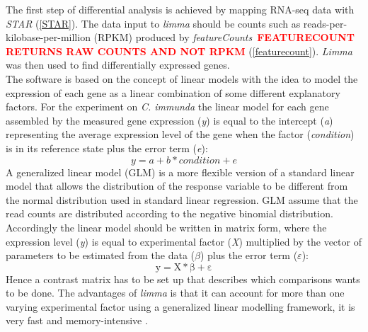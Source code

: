 \documentclass[12pt, a4paper]{report}
\newcommand{\HT}[1]{\textcolor{red}\textbf{#1}}
\begin{document}
The first step of differential analysis is achieved by mapping RNA-seq data with \textit{STAR} (\ref{STAR}). The data input to \textit{limma} should be counts such as reads-per-kilobase-per-million (RPKM) produced by \textit{featureCounts}~\HT{FEATURECOUNT RETURNS RAW COUNTS AND NOT RPKM} (\ref{featurecount}). \textit{Limma} was then used to find differentially expressed genes. \\
The software is based on the concept of linear models with the idea to model the expression of each gene as a linear combination of some different explanatory factors. For the experiment on \textit{C. immunda} the linear model for each gene assembled by the measured gene expression (\textit{y}) is equal to the intercept (\textit{a}) representing the average expression level of the gene when the factor (\textit{condition}) is in its reference state plus the error term (\textit{e}): 
\[y = a + b * condition + e\]
A generalized linear model (GLM) is a more flexible version of a standard linear model that allows the distribution of the response variable to be different from the normal distribution used in standard linear regression. GLM assume that the read counts are distributed according to the negative binomial distribution. 
Accordingly the linear model should be written in matrix form, where the expression level (\textit{y}) is equal to experimental factor (\textit{X}) multiplied by the vector of parameters to be estimated from the data ($\beta$) plus the error term ($\varepsilon$):
\[ \mathrm{ y = X * \beta + \varepsilon}\]
Hence a contrast matrix has to be set up that describes which comparisons wants to be done. The advantages of \textit{limma} is that it can account for more than one varying experimental factor using a generalized linear modelling framework, it is very fast and memory-intensive \cite{Ritchie2015}. 
\end{document}
